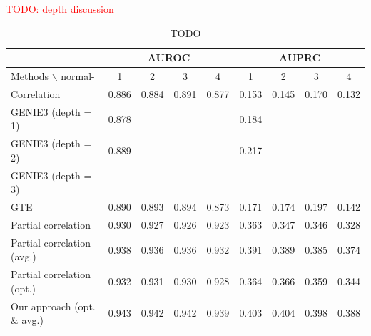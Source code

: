\documentclass[wcp]{jmlr}
\begin{document}












\textcolor{red}{TODO: depth discussion }


\begin{table}
\small
\centering
\begin{tabular}{@{}l *{8}{c}@{}}
  & \multicolumn{4}{c}{AUROC} & \multicolumn{4}{c}{AUPRC} \\
\hline \hline
Methods $\backslash$ normal- & 1 & 2 & 3 & 4 & 1 & 2 & 3 & 4 \\
\hline \hline
Correlation            & 0.886 & 0.884 & 0.891 & 0.877 & 0.153 & 0.145 & 0.170 & 0.132 \\
GENIE3 (depth = 1)     & 0.878 & & & & 0.184 & & & \\
GENIE3 (depth = 2)     & 0.889 & & & & 0.217 & & & \\
GENIE3 (depth = 3)     & & & & & & & & \\
GTE                    & 0.890 & 0.893 & 0.894 & 0.873 & 0.171 & 0.174 & 0.197 & 0.142 \\
Partial correlation    & 0.930 &  0.927 &  0.926 &  0.923& 0.363  & 0.347 &  0.346 & 0.328 \\
Partial correlation (avg.) & 0.938 & 0.936 & 0.936 & 0.932& 0.391 & 0.389 & 0.385 & 0.374\\
Partial correlation (opt.) & 0.932 & 0.931 & 0.930 & 0.928 & 0.364 & 0.366 & 0.359 & 0.344 \\
Our approach (opt. \& avg.)    & 0.943 & 0.942 & 0.942 & 0.939 & 0.403 & 0.404 & 0.398 & 0.388 \\
\end{tabular}
\caption{TODO}
\label{tab:tab1}
\end{table}
\end{document}
